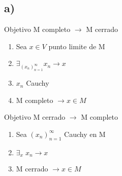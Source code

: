 \subsection*{a)}

Objetivo M completo $\to$ M cerrado

\begin{enumerate}
	\item Sea $x \in V$ punto limite de M
	\item $\exists_{(x_n)_{n=1}^\infty} x_n \to x$
	\item $x_n$ Cauchy
	\item M completo $\to x \in M$ 
\end{enumerate}

Objetivo M cerrado $\to$ M completo

\begin{enumerate}
	\item Sea $(x_n)_{n=1}^\infty$ Cauchy en M
	\item $\exists_{x} \; x_n \to x$
	\item M cerrado $\to x \in M$
\end{enumerate}
